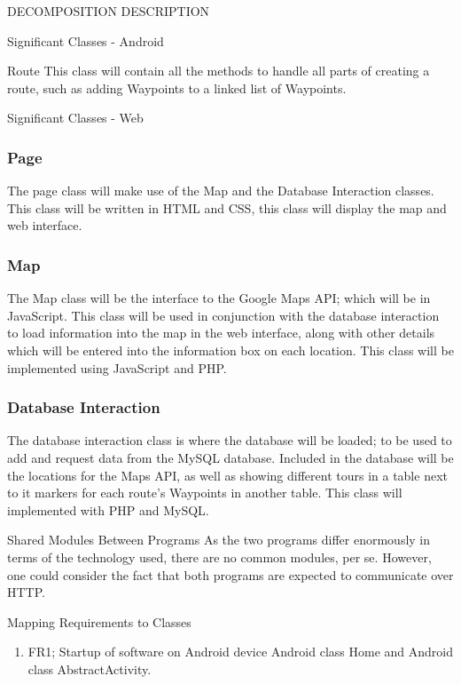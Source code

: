 \documentclass{article}
\begin{document}
\begin{section}{DECOMPOSITION DESCRIPTION}
\begin{subsection}{Significant Classes - Android}
		    \begin{subsubsection}{Route}
		    This class will contain all the methods to handle all parts of creating a route, such as adding Waypoints to a linked list of Waypoints.
		    \end{subsubsection}
	    \end{subsection}
	
	    \begin{subsection}{Significant Classes - Web}
		    \subsubsection{Page}
		    The page class will make use of the Map and the Database Interaction classes. This class will be written in HTML and CSS, this class will display the map and web interface.

		    \subsubsection{Map}
		    The Map class will be the interface to the Google Maps API; which will be in JavaScript. This class will be used in conjunction with the database interaction to load information into the map in the web interface, along with other details which will be entered into the information box on each location. This class will be implemented using JavaScript and PHP.

		    \subsubsection{Database Interaction}
		    The database interaction class is where the database will be loaded; to be used to add and request data from the MySQL database. Included in the database will be the locations for the Maps API, as well as showing different tours in a table next to it markers for each route's Waypoints in another table. This class will implemented with PHP and MySQL.
	    \end{subsection}

    
    \begin{subsection}{Shared Modules Between Programs}
        As the two programs differ enormously in terms of the technology used, there are no common modules, per se. However, one could consider the fact that both programs are expected to communicate over HTTP.
    \end{subsection}


	\clearpage
	\begin{subsection}{Mapping Requirements to Classes}
        \begin{enumerate}
		    \item{FR1; Startup of software on Android device}
		    Android class Home and Android class AbstractActivity.


\end{enumerate}
\end{subsection}
\end{section}
\end{document}
